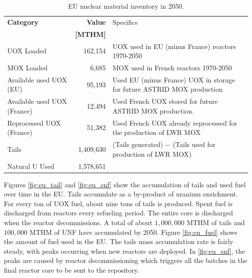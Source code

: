 \begin{table}[h]
	\centering
        \caption{\gls{EU} nuclear material inventory in 2050.}
\begin{tabularx}{\textwidth}{XrX}
			\hline
                        \textbf{Category} & \textbf{Value} & Specifics \\
                                          & \textbf{[MTHM]} & \\ \hline
                        UOX Loaded  & 162,154 & UOX used in EU (minus France) reactors 1970-2050\\ 
			MOX Loaded  & 6,685  & MOX used in French reactors 1970-2050\\
                        Available used UOX (EU)  & 95,193  & Used EU (minus France) 
                                UOX in storage for future ASTRID MOX 
                                production\\
                        Available used UOX (France) & 
                                12,494  & Used French UOX stored for 
                                future ASTRID MOX production. \\
                                Reprocessed UOX (France) & 51,382 & Used French UOX already reprocessed for the production of LWR MOX \\
			Tails  & 1,409,630  & (Tails generated) $-$ (Tails used for production of LWR MOX) \\ 
			Natural U Used  & 1,578,651  & \\ \hline
		\end{tabularx}
		
		\label{tab:sim_result1}
\end {table}
\FloatBarrier


Figures \ref{fig:eu_tail} and \ref{fig:eu_snf} show the 
accumulation of tails and used fuel over time in the \gls{EU}.
Tails accumulate as a by-product of uranium enrichment. For every
ton of \gls{UOX} fuel, about nine tons of tails is produced. 
Spent fuel is discharged from reactors every refueling period.
The entire core is discharged when the reactor decommissions.
A total of about $1,000,000$ MTHM of tails and $100,000$ MTHM of
\gls{UNF} have accumulated by 2050.
Figure \ref{fig:eu_fuel} shows the amount of fuel used in the \gls{EU}. The 
tails mass accumulation rate is fairly steady, with peaks occurring when new 
reactors are deployed.
In \cref{fig:eu_snf}, the peaks are caused by reactor decommissioning which 
triggers all the batches in the final reactor core to be sent to the repository.

